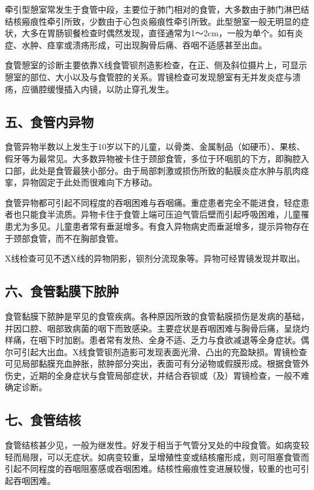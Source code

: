 牵引型憩室常发生于食管中段，主要位于肺门相对的食管，大多数由于肺门淋巴结结核瘢痕性牵引所致，少数由于心包炎瘢痕性牵引所致。此型憩室一般无明显的症状，大多在胃肠钡餐检查时偶然发现，直径通常为1～2cm，一般为单个。如有炎症、水肿、痉挛或溃疡形成，可出现胸骨后痛、吞咽不适感甚至出血。

食管憩室的诊断主要依靠X线食管钡剂造影检查，在正、侧及斜位摄片上，可显示憩室的部位、大小以及与食管腔的关系。胃镜检查可发现憩室有无并发炎症与溃疡，应循腔缓慢插入内镜，以防止穿孔发生。

\subsection{五、食管内异物}

食管异物半数以上发生于10岁以下的儿童，以骨类、金属制品（如硬币）、果核、假牙等为最常见。大多数异物被卡住于颈部食管，多位于环咽肌的下方，即胸腔入口部，此处是食管最狭小部分。由于局部刺激或损伤所致的黏膜炎症水肿与肌肉痉挛，异物固定于此处而很难向下方移动。

食管异物都可引起不同程度的吞咽困难与吞咽痛。重症患者完全不能进食，轻症患者也只能食半流质。异物卡住于食管上端可压迫气管后壁而引起呼吸困难，儿童罹患尤为多见。儿童患者常有垂涎增多。有食入异物病史而垂涎增多，提示异物存在于颈部食管，而不在胸部食管。

X线检查可见不透X线的异物阴影，钡剂分流现象等。异物可经胃镜发现并取出。

\subsection{六、食管黏膜下脓肿}

食管黏膜下脓肿是罕见的食管疾病。各种原因所致的食管黏膜损伤是发病的基础，并因口腔、咽部致病菌的咽下而致感染。主要症状是吞咽困难与胸骨后痛，呈烧灼样痛，在咽下时加剧。患者常有发热、全身不适、乏力与食欲减退等全身症状。偶尔可引起大出血。X线食管钡剂造影可发现表面光滑、凸出的充盈缺损。胃镜检查可见局部黏膜充血肿胀，脓肿部分突出，表面可有分泌物或假膜形成。根据食管外伤史，近期的全身症状与食管局部症状，并结合吞钡或（及）胃镜检查，一般不难确定诊断。

\subsection{七、食管结核}

食管结核甚少见，一般为继发性。好发于相当于气管分叉处的中段食管。如病变较轻而局限，可以无症状。如病变较重，呈增殖性变或结核瘤形成，则可阻塞食管而引起不同程度的吞咽阻塞感或吞咽困难。结核性瘢痕性变进展较慢，较重的也可引起吞咽困难。

